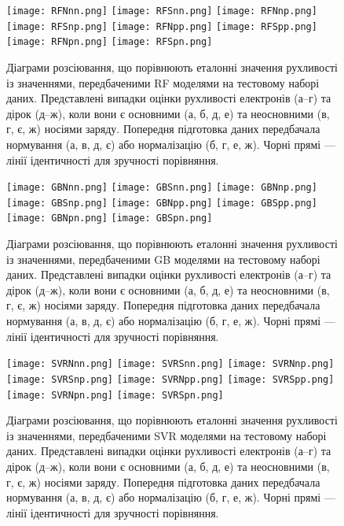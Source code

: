 \documentclass[14pt,a4paper,titlepage,oneside]{book}
\numberwithin{equation}{part}
\begin{document}
\begin{figure}
	\centering
     \texttt{[image: RFNnn.png]}\kern 20pt
     \texttt{[image: RFSnn.png]}
     \texttt{[image: RFNnp.png]}\kern 20pt
     \texttt{[image: RFSnp.png]}
     \texttt{[image: RFNpp.png]}\kern 20pt
     \texttt{[image: RFSpp.png]}
     \texttt{[image: RFNpn.png]}\kern 20pt
     \texttt{[image: RFSpn.png]}
	  \caption{Діаграми розсіювання, що порівнюють еталонні значення рухливості із значеннями, передбаченими RF моделями
       на тестовому наборі даних.
       Представлені випадки оцінки рухливості електронів (а--г) та дірок (д--ж), коли вони є
       основними (а, б, д, е) та неосновними (в, г, є, ж) носіями заряду.
       Попередня підготовка даних передбачала нормування (а, в, д, є) або нормалізацію (б, г, е, ж).
       Чорні прямі --- лінії ідентичності для зручності порівняння.
}\label{figRF}
\end{figure}

\begin{figure}
	\centering
     \texttt{[image: GBNnn.png]}\kern 20pt
     \texttt{[image: GBSnn.png]}
     \texttt{[image: GBNnp.png]}\kern 20pt
     \texttt{[image: GBSnp.png]}
     \texttt{[image: GBNpp.png]}\kern 20pt
     \texttt{[image: GBSpp.png]}
     \texttt{[image: GBNpn.png]}\kern 20pt
     \texttt{[image: GBSpn.png]}
	  \caption{Діаграми розсіювання, що порівнюють еталонні значення рухливості із значеннями, передбаченими GB моделями
       на тестовому наборі даних.
       Представлені випадки оцінки рухливості електронів (а--г) та дірок (д--ж), коли вони є
       основними (а, б, д, е) та неосновними (в, г, є, ж) носіями заряду.
       Попередня підготовка даних передбачала нормування (а, в, д, є) або нормалізацію (б, г, е, ж).
       Чорні прямі --- лінії ідентичності для зручності порівняння.
}\label{figGB}
\end{figure}


\begin{figure}
	\centering
     \texttt{[image: SVRNnn.png]}\kern 20pt
     \texttt{[image: SVRSnn.png]}
     \texttt{[image: SVRNnp.png]}\kern 20pt
     \texttt{[image: SVRSnp.png]}
     \texttt{[image: SVRNpp.png]}\kern 20pt
     \texttt{[image: SVRSpp.png]}
     \texttt{[image: SVRNpn.png]}\kern 20pt
     \texttt{[image: SVRSpn.png]}
	  \caption{Діаграми розсіювання, що порівнюють еталонні значення рухливості із значеннями, передбаченими SVR моделями
       на тестовому наборі даних.
       Представлені випадки оцінки рухливості електронів (а--г) та дірок (д--ж), коли вони є
       основними (а, б, д, е) та неосновними (в, г, є, ж) носіями заряду.
       Попередня підготовка даних передбачала нормування (а, в, д, є) або нормалізацію (б, г, е, ж).
       Чорні прямі --- лінії ідентичності для зручності порівняння.
}\label{figSVR}
\end{figure}
\end{document}
